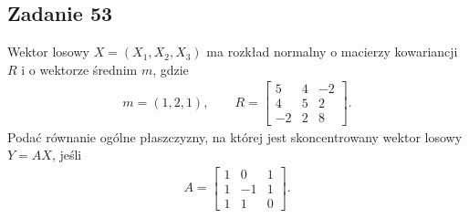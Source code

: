 \subsection*{Zadanie 53}
Wektor losowy $ X=(X_1,X_2,X_3) $ ma rozkład normalny o macierzy kowariancji $ R $ i o wektorze średnim $ m $, gdzie
\begin{gather*}
m=(1,2,1),\qquad
R=\begin{bmatrix}
	5  & 4 & -2 \\
	4  & 5 & 2  \\
	-2 & 2 & 8
\end{bmatrix}.
\end{gather*}
Podać równanie ogólne płaszczyzny, na której jest skoncentrowany wektor losowy $ Y=AX $, jeśli
\begin{gather*}
A=
\begin{bmatrix}
	1 & 0  & 1 \\
	1 & -1 & 1 \\
	1 & 1  & 0
\end{bmatrix}.
\end{gather*}

